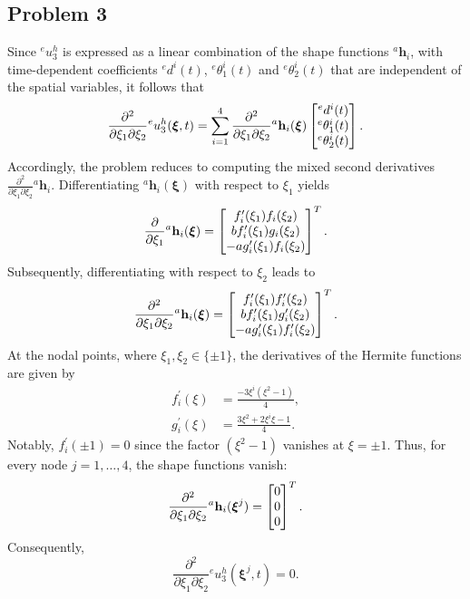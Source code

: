 \documentclass[12pt]{article}
\begin{document}
\subsection*{Problem 3}
Since ${}^e u_3^h$ is expressed as a linear combination of the shape functions ${}^a \mathbf{h}_i$, with time-dependent coefficients ${}^e d^i(t)$, ${}^e \theta^i_1(t)$ and ${}^e \theta^i_2(t)$ that are independent of the spatial variables, it follows that
\[
    \frac{\partial^2}{\partial \xi_1 \partial \xi_2} {}^e u_3^h(\boldsymbol{\xi},t) = \sum_{i=1}^4  \frac{\partial^2}{\partial \xi_1 \partial \xi_2}{}^a \mathbf{h}_i(\boldsymbol\xi)
    \begin{bmatrix}
        {}^e d^i(t)        \\
        {}^e \theta_1^i(t) \\
        {}^e \theta_2^i(t) \\
    \end{bmatrix}.
\]
Accordingly, the problem reduces to computing the mixed second derivatives \( \frac{\partial^2}{\partial \xi_1 \partial \xi_2}{}^a \mathbf{h}_i\). Differentiating \({}^a \mathbf{h}_i(\boldsymbol{\xi})\) with respect to \(\xi_1\) yields
\[
    \frac{\partial }{\partial \xi_1}{}^a \mathbf{h}_i(\boldsymbol\xi) = \begin{bmatrix}
        f_i^\prime(\xi_1)f_i(\xi_2)    \\
        bf_i^\prime(\xi_1)g_i(\xi_2)   \\
        -a g_i^\prime(\xi_1)f_i(\xi_2) \\
    \end{bmatrix}^T.
\]
Subsequently, differentiating with respect to $\xi_2$ leads to
$$
    \frac{\partial^2}{\partial \xi_1 \partial \xi_2}{}^a \mathbf{h}_i(\boldsymbol\xi) = \begin{bmatrix}
        f_i^\prime(\xi_1)f_i^\prime(\xi_2)    \\
        bf_i^\prime(\xi_1)g_i^\prime(\xi_2)   \\
        -a g_i^\prime(\xi_1)f_i^\prime(\xi_2) \\
    \end{bmatrix}^T.
$$
At the nodal points, where \(\xi_1, \xi_2 \in \{\pm 1\}\), the derivatives of the Hermite functions are given by
\begin{align*}
    f_i^\prime(\xi) & = \frac{-3\xi^i (\xi^2 - 1)}{4},     \\
    g_i^\prime(\xi) & = \frac{3\xi^2 + 2\xi^i \xi - 1}{4}.
\end{align*}
Notably, $f_i^\prime(\pm 1) = 0$ since the factor $(\xi^2 - 1)$ vanishes at $\xi = \pm 1$. Thus, for every node $j=1,\dots,4$, the shape functions vanish:
\[
    \frac{\partial^2 }{\partial \xi_1 \partial \xi_2}{}^a \mathbf{h}_i(\boldsymbol\xi^j)=\begin{bmatrix}
        0 \\
        0 \\
        0 \\
    \end{bmatrix}^T.
\]
Consequently,
\[
    \frac{\partial^2}{\partial \xi_1 \partial \xi_2} {}^e u_3^h(\boldsymbol{\xi}^j,t)= 0.
\]
\end{document}
